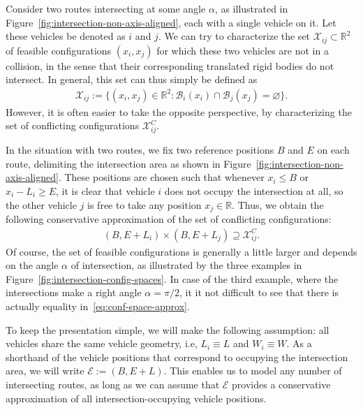 \documentclass[a4paper]{report}
\newcommand{\comment}[1]{\pdfmargincomment[author=Jeroen van Riel]{#1}}
\theoremstyle{definition}
\theoremstyle{plain}
\begin{document}
Consider two routes intersecting at some angle $\alpha$, as illustrated in
Figure~\ref{fig:intersection-non-axis-aligned}, each with a single vehicle on
it. Let these vehicles be denoted as $i$ and $j$.
%
We can try to characterize the set $\mathcal{X}_{ij} \subset \mathbb{R}^{2}$ of
feasible configurations $(x_{i}, x_{j})$ for which these two vehicles are not in
a collision, in the sense that their corresponding translated rigid bodies do
not intersect.
%
In general, this set can thus simply be defined as
\begin{align}
  \label{eq:3}
  \mathcal{X}_{ij} := \{ (x_{i}, x_{j}) \in \mathbb{R}^{2} : \mathcal{B}_{i}(x_{i}) \cap \mathcal{B}_{j}(x_{j}) = \varnothing \} .
\end{align}
%
However, it is often easier to take the opposite perspective, by characterizing
the set of conflicting configurations $\mathcal{X}_{ij}^{C}$. \comment{Nice, ``C''
  for conflict and for complement!}

%
In the situation with two routes, we fix two reference positions $B$ and $E$ on
each route, delimiting the intersection area as shown in
Figure~\ref{fig:intersection-non-axis-aligned}.
%
These positions are chosen such that whenever $x_{i} \leq B$ or
$x_{i} - L_{i} \geq E$, it is clear that vehicle $i$ does not occupy the intersection
at all, so the other vehicle $j$ is free to take any position
$x_{j} \in \mathbb{R}$.
%
Thus, we obtain the following conservative approximation of the set of conflicting
configurations:
\begin{align}\label{eq:conf-space-approx}
  (B,E + L_{i}) \times (B, E + L_{j}) \supseteq \mathcal{X}_{ij}^{C} .
\end{align}
Of course, the set of feasible configurations is generally a little larger and
depends on the angle $\alpha$ of intersection, as illustrated by the three examples
in Figure~\ref{fig:intersection-config-spaces}.
%
In case of the third example, where the intersections make a right angle
$\alpha = \pi/2$, it it not difficult to see that there is actually equality in~\eqref{eq:conf-space-approx}.

To keep the presentation simple, we will make the following assumption: all
vehicles share the same vehicle geometry, i.e, $L_{i} \equiv L$ and
$W_{i} \equiv W$. As a shorthand of the vehicle positions that correspond to
occupying the intersection area, we will write $\mathcal{E} := (B, E + L)$.
%
This enables us to model any number of intersecting routes, as long as we can
assume that $\mathcal{E}$ provides a conservative approximation of all
intersection-occupying vehicle positions.
\end{document}
